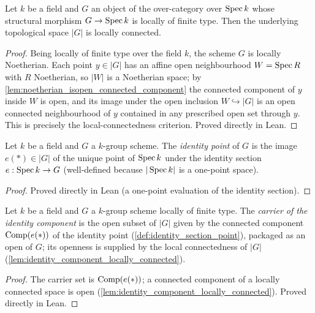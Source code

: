 \begin{lemma}\leanok
  \label{lem:identity_component_locally_connected}
  Let \(k\) be a field and \(G\) an object of the over-category over
  \(\operatorname{Spec} k\) whose structural morphism \(G \to \operatorname{Spec} k\) is locally of
  finite type. Then the underlying topological space \(|G|\) is locally
  connected.
\end{lemma}
\begin{proof}
  Being locally of finite type over the field \(k\), the scheme \(G\) is
  locally Noetherian. Each point \(y \in |G|\) has an affine open
  neighbourhood \(W = \operatorname{Spec} R\) with \(R\) Noetherian, so \(|W|\) is a
  Noetherian space; by
  \cref{lem:noetherian_isopen_connected_component} the connected component
  of \(y\) inside \(W\) is open, and its image under the open inclusion
  \(W \hookrightarrow |G|\) is an open connected neighbourhood of \(y\)
  contained in any prescribed open set through \(y\). This is precisely the
  local-connectedness criterion. Proved directly in Lean.
\end{proof}

\begin{definition}\leanok
  \label{def:identity_section_point}
  Let \(k\) be a field and \(G\) a \(k\)-group scheme. The
  \emph{identity point} of \(G\) is the image \(e(\ast) \in |G|\) of the
  unique point of \(\operatorname{Spec} k\) under the identity section
  \(e : \operatorname{Spec} k \to G\) (well-defined because \(|\operatorname{Spec} k|\) is a
  one-point space).
\end{definition}
\begin{proof}
  Proved directly in Lean (a one-point evaluation of the identity
  section).
\end{proof}

\begin{definition}\leanok
  \label{def:identity_component_carrier}
  Let \(k\) be a field and \(G\) a \(k\)-group scheme locally of finite
  type. The \emph{carrier of the identity component} is the open subset of
  \(|G|\) given by the connected component
  \(\operatorname{Comp}(e(\ast))\) of the identity point
  (\cref{def:identity_section_point}), packaged as an open of \(G\); its
  openness is supplied by the local connectedness of \(|G|\)
  (\cref{lem:identity_component_locally_connected}).
\end{definition}
\begin{proof}
  The carrier set is \(\operatorname{Comp}(e(\ast))\); a connected component of a
  locally connected space is open
  (\cref{lem:identity_component_locally_connected}). Proved directly in
  Lean.
\end{proof}

